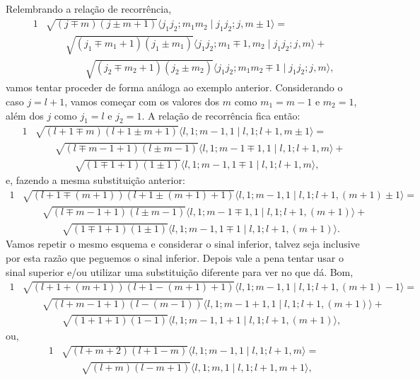 \documentclass{article}
\newcommand{\braket}[2]{\langle #1 \!\mid\! #2 \rangle}
\begin{document}
Relembrando a relação de recorrência,
\begin{alignat}{1}
\nonumber
 &\sqrt{(j \mp m)(j \pm m + 1)} \braket{j_1 j_2;m_1m_2}{j_1j_2;j,m\pm1} = \\ \nonumber
 &\qquad \sqrt{(j_1 \mp m_1 + 1)(j_1 \pm m_1)} \braket{j_1 j_2;m_1\mp1,m_2}{j_1j_2;j,m} + \\
 &\qquad \qquad \sqrt{(j_2 \mp m_2 + 1)(j_2 \pm m_2)} \braket{j_1 j_2;m_1m_2\mp1}{j_1j_2;j,m} \mathrm{,}
\end{alignat}
vamos tentar proceder de forma análoga ao exemplo anterior.
Considerando o caso $j = l + 1$, vamos começar com os valores dos $m$ como $m_1 = m - 1$ e $m_2 = 1$, além dos $j$ como $j_1 = l$ e $j_2 = 1$.
A relação de recorrência fica então:
\begin{alignat}{1}
\nonumber
 &\sqrt{(l + 1 \mp m)(l + 1 \pm m + 1)} \braket{l, 1;m - 1,1}{l,1;l + 1,m\pm1} = \\ \nonumber
 &\qquad \sqrt{(l \mp m - 1 + 1)(l \pm m - 1)} \braket{l, 1;m - 1\mp1,1}{l,1;l + 1,m} + \\
 &\qquad \qquad \sqrt{(1 \mp 1 + 1)(1 \pm 1)} \braket{l, 1;m - 1,1\mp1}{l,1;l + 1,m} \mathrm{,}
\end{alignat}
e, fazendo a mesma substituição anterior:
\begin{alignat}{1}
\nonumber
 &\sqrt{(l + 1 \mp (m + 1))(l + 1 \pm (m + 1) + 1)} \braket{l, 1;m - 1,1}{l,1;l + 1,(m + 1)\pm1} = \\ \nonumber
 &\qquad \sqrt{(l \mp m - 1 + 1)(l \pm m - 1)} \braket{l, 1;m - 1\mp1,1}{l,1;l + 1,(m + 1)} + \\
 &\qquad \qquad \sqrt{(1 \mp 1 + 1)(1 \pm 1)} \braket{l, 1;m - 1,1\mp1}{l,1;l + 1,(m + 1)} \mathrm{.}
\end{alignat}
Vamos repetir o mesmo esquema e considerar o sinal inferior, talvez seja inclusive por esta razão que peguemos o sinal inferior. Depois vale a pena tentar usar o sinal
superior e/ou utilizar uma substituição diferente para ver no que dá. Bom,
\begin{alignat}{1}
\nonumber
 &\sqrt{(l + 1 + (m + 1))(l + 1 - (m + 1) + 1)} \braket{l, 1;m - 1,1}{l,1;l + 1,(m + 1)-1} = \\ \nonumber
 &\qquad \sqrt{(l + m - 1 + 1)(l - ( m - 1 ) )} \braket{l, 1;m - 1 + 1,1}{l,1;l + 1,(m + 1)} + \\
 &\qquad \qquad \sqrt{(1 + 1 + 1)(1 - 1)} \braket{l, 1;m - 1,1 + 1}{l,1;l + 1,(m + 1)} \mathrm{,}
\end{alignat}
ou,
\begin{alignat}{1}
\nonumber
 &\sqrt{(l + m + 2)(l + 1 - m)} \braket{l, 1;m - 1,1}{l,1;l + 1,m} = \\
 &\qquad \sqrt{(l + m)(l - m + 1 )} \braket{l, 1;m,1}{l,1;l + 1,m + 1} \mathrm{,}
\end{alignat}
\end{document}
